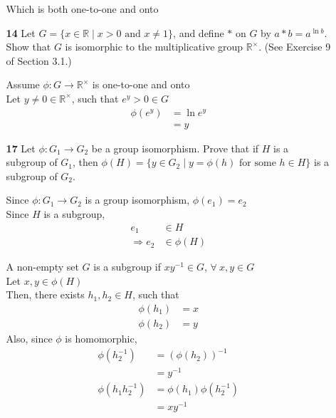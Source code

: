 \documentclass[paper=usletter, fontsize=12pt]{article}
\begin{document}
\begin{itemize}
\begin{itemize}
\begin{cproof}
                Which is both one-to-one and onto \qedhere

            \end{cproof}

            \item[\textbf{14}] Let $G=\{x \in \mathbb{R} \mid x > 0 \text{ and
            } x \neq 1\}$, and define $*$ on $G$ by $a * b = a^{\ln{b}}$. Show
            that $G$ is isomorphic to the multiplicative group
            $\mathbb{R}^{\times}$. (See Exercise 9 of Section 3.1.)
            \begin{cproof}

                Assume $\phi: G \rightarrow \mathbb{R}^{\times}$ is one-to-one
                and onto\\
                Let $y \neq 0 \in \mathbb{R}^{\times}$, such that $e^y>0 \in G$
                \begin{align*}
                    \phi(e^y) & = \ln{e^y}\\
                    & = y
                \end{align*}

            \end{cproof}

            \item[\textbf{17}] Let $\phi: G_1 \rightarrow G_2$ be a group
            isomorphism. Prove that if $H$ is a subgroup of $G_1$, then
            $\phi(H)=\{y\in G_2 \mid y = \phi(h) \text{ for some } h \in H\}$
            is a subgroup of $G_2$.
            \begin{cproof}

                Since $\phi:G_1 \rightarrow G_2$ is a group isomorphism,
                $\phi(e_1)=e_2$\\
                Since $H$ is a subgroup,
                \begin{align*}
                    e_1 & \in H\\
                    \Rightarrow e_2 & \in \phi(H)
                \end{align*}

                A non-empty set $G$ is a subgroup if $xy^{-1}\in G$, $\forall \
                x,y\in G$\\
                Let $x,y \in \phi(H)$\\
                Then, there exists $h_1,h_2 \in H$, such that
                \begin{align*}
                    \phi(h_1) & = x\\
                    \phi(h_2) & = y
                \end{align*}
                Also, since $\phi$ is homomorphic,
                \begin{align*}
                    \phi(h_2^{-1}) & = (\phi(h_2))^{-1}\\
                    & = y^{-1}\\
                    \phi(h_1h_2^{-1}) & = \phi(h_1)\phi(h_2^{-1})\\
                    & = xy^{-1}
                \end{align*}


\end{cproof}
\end{itemize}
\end{itemize}
\end{document}
